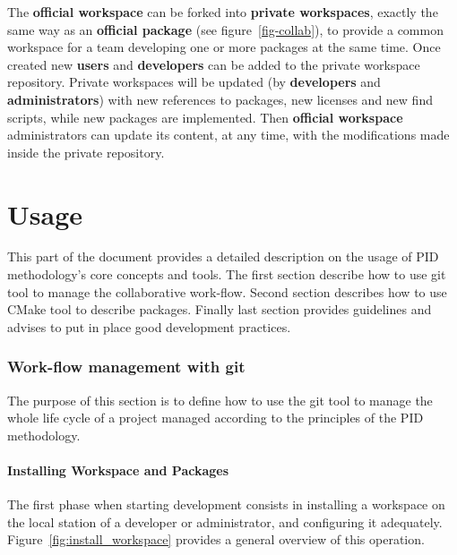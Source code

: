 \documentclass[12pt,a4paper]{article}
\begin{document}
The \textbf{official workspace} can be forked into \textbf{private workspaces}, exactly the same way as an \textbf{official package} (see figure~\ref{fig-collab}), to provide a common workspace for a team developing one or more packages at the same time. Once created new \textbf{users} and \textbf{developers} can be added to the private workspace repository. Private workspaces will be updated (by \textbf{developers} and \textbf{administrators}) with new references to packages, new licenses and new find scripts, while new packages are implemented. Then \textbf{official workspace} administrators can update its content, at any time, with the modifications made inside the private repository.

\pagebreak

\part{Usage}

This part of the document provides a detailed description on the usage of PID methodology's core concepts and tools. The first section describe how to use git tool to manage the collaborative work-flow. Second section describes how to use CMake tool to describe packages. Finally last section provides guidelines and advises to put in place good development practices.


\section{Work-flow management with git}

The purpose of this section is to define how to use the git tool to manage the whole life cycle of a project managed according to the principles of the PID methodology.

\subsection{Installing Workspace and Packages}

The first phase when starting development consists in installing a workspace on the local  station of a developer or administrator, and configuring it adequately. Figure~\ref{fig:install_workspace} provides a general overview of this operation.
\end{document}
